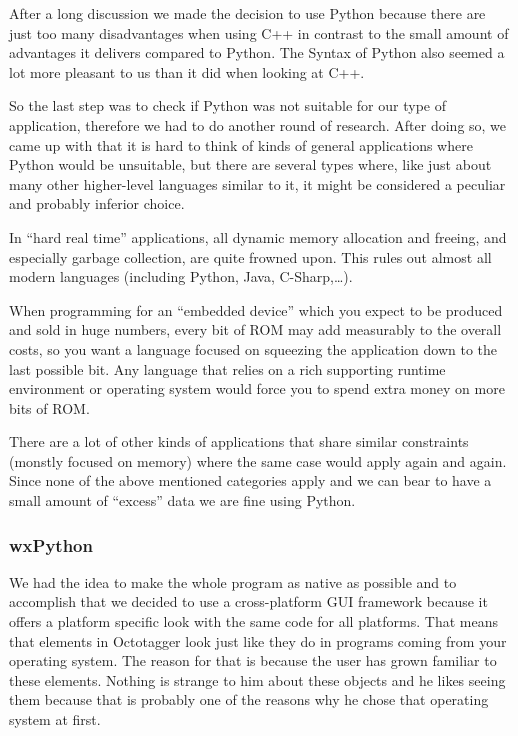 After a long discussion we made the decision to use Python because there are just too many disadvantages when using C++ in contrast to the small amount of advantages it delivers compared to Python. The Syntax of Python also seemed a lot more pleasant to us than it did when looking at C++.

So the last step was to check if Python was not suitable for our type of application, therefore we had to do another round of research. After doing so, we came up with that it is hard to think of kinds of general applications where Python would be unsuitable, but there are several types where, like just about many other higher-level languages similar to it, it might be considered a peculiar and probably inferior choice.

In ``hard real time'' applications, all dynamic memory allocation and freeing, and especially garbage collection, are quite frowned upon. This rules out almost all modern languages (including Python, Java, C-Sharp,\ldots{}).

When programming for an ``embedded device'' which you expect to be produced and sold in huge numbers, every bit of ROM may add measurably to the overall costs, so you want a language focused on squeezing the application down to the last possible bit. Any language that relies on a rich supporting runtime environment or operating system would force you to spend extra money on more bits of ROM.

There are a lot of other kinds of applications that share similar constraints (monstly focused on memory) where the same case would apply again and again. Since none of the above mentioned categories apply and we can bear to have a small amount of ``excess'' data we are fine using Python.

\subsubsection{wxPython}
We had the idea to make the whole program as native as possible and to accomplish that we decided to use a cross-platform GUI framework because it offers a platform specific look with the same code for all platforms. That means that elements in Octotagger look just like they do in programs coming from your operating system. The reason for that is because the user has grown familiar to these elements. Nothing is strange to him about these objects and he likes seeing them because that is probably one of the reasons why he chose that operating system at first.

